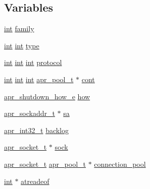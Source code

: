\subsection*{Variables}
\begin{DoxyCompactItemize}
\item 
\hyperlink{pcre_8txt_a42dfa4ff673c82d8efe7144098fbc198}{int} \hyperlink{group__apr__network__io_ga22f2baef89908641382fdf6fb41e8b83}{family}
\item 
\hyperlink{pcre_8txt_a42dfa4ff673c82d8efe7144098fbc198}{int} \hyperlink{pcre_8txt_a42dfa4ff673c82d8efe7144098fbc198}{int} \hyperlink{group__apr__network__io_ga83576a2bbe119057c36ad3be1039daf9}{type}
\item 
\hyperlink{pcre_8txt_a42dfa4ff673c82d8efe7144098fbc198}{int} \hyperlink{pcre_8txt_a42dfa4ff673c82d8efe7144098fbc198}{int} \hyperlink{pcre_8txt_a42dfa4ff673c82d8efe7144098fbc198}{int} \hyperlink{group__apr__network__io_gaffe05cd2fe14c30ec8ea72e19680fbda}{protocol}
\item 
\hyperlink{pcre_8txt_a42dfa4ff673c82d8efe7144098fbc198}{int} \hyperlink{pcre_8txt_a42dfa4ff673c82d8efe7144098fbc198}{int} \hyperlink{pcre_8txt_a42dfa4ff673c82d8efe7144098fbc198}{int} \hyperlink{structapr__pool__t}{apr\+\_\+pool\+\_\+t} $\ast$ \hyperlink{group__apr__network__io_ga888231ce553dfdd4349f77b1e7582636}{cont}
\item 
\hyperlink{group__apr__network__io_gae2130f1fa2d0db58c5c3c9c73d9b4009}{apr\+\_\+shutdown\+\_\+how\+\_\+e} \hyperlink{group__apr__network__io_ga9590c380aa45d7405869b44456f744b5}{how}
\item 
\hyperlink{structapr__sockaddr__t}{apr\+\_\+sockaddr\+\_\+t} $\ast$ \hyperlink{group__apr__network__io_ga5dc1cb3876df6ab646ee9b3d528cbd9f}{sa}
\item 
\hyperlink{group__apr__platform_ga21ef1e35fd3ff9be386f3cb20164ff02}{apr\+\_\+int32\+\_\+t} \hyperlink{group__apr__network__io_ga8ab200d7cdc39cd5efe5114a1ebc5969}{backlog}
\item 
\hyperlink{structapr__socket__t}{apr\+\_\+socket\+\_\+t} $\ast$ \hyperlink{group__apr__network__io_ga27d162243808e1e5fb7627d9dba89f9e}{sock}
\item 
\hyperlink{structapr__socket__t}{apr\+\_\+socket\+\_\+t} \hyperlink{structapr__pool__t}{apr\+\_\+pool\+\_\+t} $\ast$ \hyperlink{group__apr__network__io_gae45304feb96d8b870698bf131e538151}{connection\+\_\+pool}
\item 
\hyperlink{pcre_8txt_a42dfa4ff673c82d8efe7144098fbc198}{int} $\ast$ \hyperlink{group__apr__network__io_gabcfc2cbd257ea79c038f27c8b6270fc8}{atreadeof}

\end{DoxyCompactItemize}
